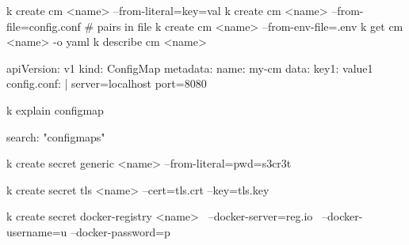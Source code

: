\begin{tcbitemize}[
  raster columns=3, raster equal height=rows,
  blanker, cheat subtitle
]

  \tcbitem

    \begin{cheatcodebashbold}
    k create cm <name> --from-literal=key=val
    k create cm <name> --from-file=config.conf # pairs in file
    k create cm <name> --from-env-file=.env
    k get cm <name> -o yaml
    k describe cm <name>
    \end{cheatcodebashbold}


    \begin{cheatcodebash}
    apiVersion: v1
    kind: ConfigMap
    metadata: {name: my-cm}
    data:
      key1: value1
      config.conf: |
        server=localhost
        port=8080
    \end{cheatcodebash}

    \begin{cheatcodebash}
    k explain configmap
    \end{cheatcodebash}

    \begin{cheatcodebash}
    search: "configmaps"
    \end{cheatcodebash}


  \tcbitem

    {\footnotesize {}}

    \begin{cheatcodebashbold}
    k create secret generic <name> --from-literal=pwd=s3cr3t
    \end{cheatcodebashbold}

    \begin{cheatcodebashbold}
    k create secret tls <name> --cert=tls.crt --key=tls.key
    \end{cheatcodebashbold}

    \begin{cheatcodebash}
    k create secret docker-registry <name> \
      --docker-server=reg.io \
      --docker-username=u --docker-password=p
    \end{cheatcodebash}


\end{tcbitemize}
